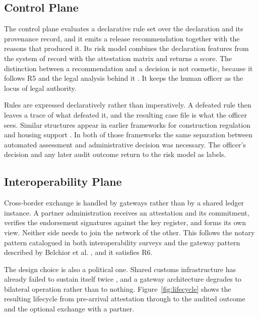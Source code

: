 \documentclass[information,article,submit,moreauthors]{Definitions/mdpi}
\begin{document}
\subsection{Control Plane}

The control plane evaluates a declarative rule set over the declaration and its provenance record, and it emits a release recommendation together with the reasons that produced it. Its risk model combines the declaration features from the system of record with the attestation matrix and returns a score. The distinction between a recommendation and a decision is not cosmetic, because it follows R5 and the legal analysis behind it \cite{governatori2018legal,mik2017limitations,micheler2020regtech}. It keeps the human officer as the locus of legal authority.

Rules are expressed declaratively rather than imperatively. A defeated rule then leaves a trace of what defeated it, and the resulting case file is what the officer sees. Similar structures appear in earlier frameworks for construction regulation \cite{alsuwaidi2024construction} and housing support \cite{alsuwaidi2024housing}. In both of those frameworks the same separation between automated assessment and administrative decision was necessary. The officer's decision and any later audit outcome return to the risk model as labels.

\subsection{Interoperability Plane}

Cross-border exchange is handled by gateways rather than by a shared ledger instance. A partner administration receives an attestation and its commitment, verifies the endorsement signatures against the key register, and forms its own view. Neither side needs to join the network of the other. This follows the notary pattern catalogued in both interoperability surveys and the gateway pattern described by Belchior et al. \cite{belchior2021interop,ren2023interop}, and it satisfies R6.

The design choice is also a political one. Shared customs infrastructure has already failed to sustain itself twice \cite{unescap2024digitalizetrade,maersk2022tradelens}, and a gateway architecture degrades to bilateral operation rather than to nothing. Figure~\ref{fig:lifecycle} shows the resulting lifecycle from pre-arrival attestation through to the audited outcome and the optional exchange with a partner.
\end{document}
